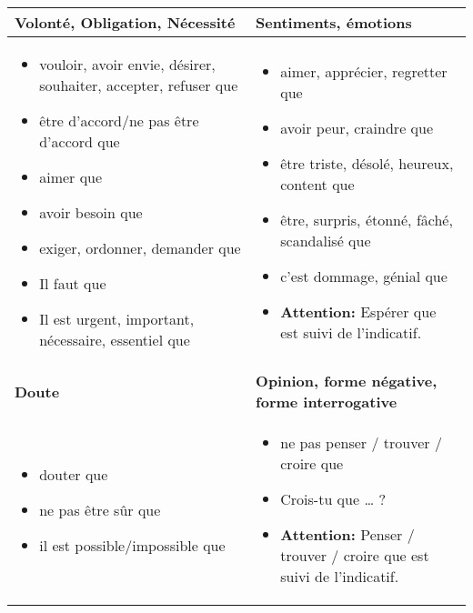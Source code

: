\documentclass{report}
\begin{document}
\begin{center}
    \begin{tabular}{|p{}|p{}|}
        \hline
        \textbf{Volonté, Obligation, Nécessité} & \textbf{Sentiments, émotions} \\
        \hline
        \begin{itemize}
            \item vouloir, avoir envie, désirer, souhaiter, accepter, refuser que
            \item être d’accord/ne pas être d’accord que
            \item aimer que
            \item avoir besoin que
            \item exiger, ordonner, demander que
            \item Il faut que
            \item Il est urgent, important, nécessaire, essentiel que
        \end{itemize} 
        & 
        \begin{itemize}
            \item aimer, apprécier, regretter que
            \item avoir peur, craindre que
            \item être triste, désolé, heureux, content que
            \item être, surpris, étonné, fâché, scandalisé que
            \item c’est dommage, génial que
            \item \textbf{Attention:} Espérer que est suivi de l'indicatif.
        \end{itemize} \\
        \hline
        \textbf{Doute} & \textbf{Opinion, forme négative, forme interrogative} \\
        \hline
        \begin{itemize}
            \item douter que
            \item ne pas être sûr que
            \item il est possible/impossible que
        \end{itemize} 
        & 
        \begin{itemize}
            \item ne pas penser / trouver / croire que
            \item Crois-tu que … ?
            \item \textbf{Attention:} Penser / trouver / croire que est suivi de l'indicatif.
        \end{itemize} \\
        \hline
    \end{tabular}
\end{center}
\end{document}
